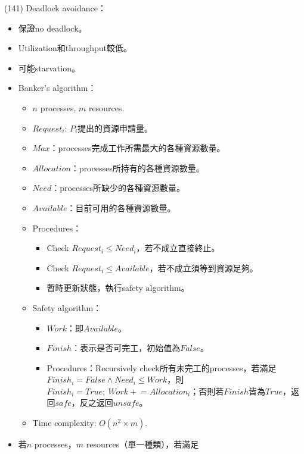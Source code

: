 \begin{theorem}{(141)} Deadlock avoidance：\begin{itemize}
        \item 保證no deadlock。
        \item Utilization和throughput較低。
        \item 可能starvation。
        \item Banker's algorithm：\begin{itemize}
            \item $n$ processes, $m$ resources.
            \item $Request_i$: $P_i$提出的資源申請量。
            \item $Max$：processes完成工作所需最大的各種資源數量。
            \item $Allocation$：processes所持有的各種資源數量。
            \item $Need$：processes所缺少的各種資源數量。
            \item $Available$：目前可用的各種資源數量。
            \item Procedures：\begin{itemize}
                \item Check $Request_i \le Need_i$，若不成立直接終止。
                \item Check $Request_i \le Available$，若不成立須等到資源足夠。
                \item 暫時更新狀態，執行safety algorithm。
            \end{itemize}
            \item Safety algorithm：\begin{itemize}
                \item $Work$：即$Available$。
                \item $Finish$：表示是否可完工，初始值為$False$。
                \item Procedures：Recursively check所有未完工的processes，若滿足$Finish_i = False \land Need_i \le Work$，則$Finish_i = True; \ Work \mathrel{+}= Allocation_i$；否則若$Finish$皆為$True$，返回$safe$，反之返回$unsafe$。
            \end{itemize}
            \item Time complexity: $O(n^2 \times m)$.
        \end{itemize}
        \item 若$n$ processes，$m$ resources（單一種類），若滿足\begin{equation} \label{eq:deadlock}

\end{equation}
\end{itemize}
\end{theorem}
